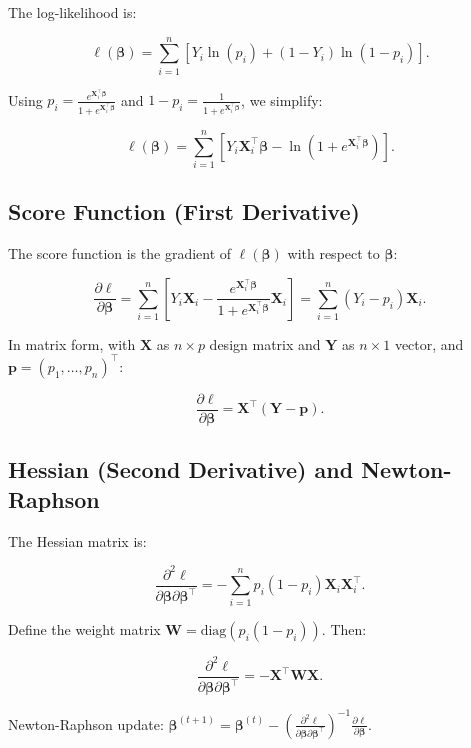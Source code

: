 \documentclass[12pt]{article}
\begin{document}
	The log-likelihood is:
	
	\[
	\ell(\boldsymbol{\beta}) = \sum_{i=1}^n \left[ Y_i \ln(p_i) + (1-Y_i)\ln(1-p_i) \right].
	\]
	
	Using $p_i = \frac{e^{\mathbf{X}_i^\top \boldsymbol{\beta}}}{1+e^{\mathbf{X}_i^\top \boldsymbol{\beta}}}$ and $1-p_i = \frac{1}{1+e^{\mathbf{X}_i^\top \boldsymbol{\beta}}}$, we simplify:
	
	\[
	\ell(\boldsymbol{\beta}) = \sum_{i=1}^n \left[ Y_i \mathbf{X}_i^\top \boldsymbol{\beta} - \ln\left(1 + e^{\mathbf{X}_i^\top \boldsymbol{\beta}}\right) \right].
	\]
	
	\subsection{Score Function (First Derivative)}
	
	The score function is the gradient of $\ell(\boldsymbol{\beta})$ with respect to $\boldsymbol{\beta}$:
	
	\[
	\frac{\partial \ell}{\partial \boldsymbol{\beta}} = \sum_{i=1}^n \left[ Y_i \mathbf{X}_i - \frac{e^{\mathbf{X}_i^\top \boldsymbol{\beta}}}{1+e^{\mathbf{X}_i^\top \boldsymbol{\beta}}} \mathbf{X}_i \right] = \sum_{i=1}^n (Y_i - p_i) \mathbf{X}_i.
	\]
	
	In matrix form, with $\mathbf{X}$ as $n \times p$ design matrix and $\mathbf{Y}$ as $n \times 1$ vector, and $\mathbf{p} = (p_1,\dots,p_n)^\top$:
	
	\[
	\frac{\partial \ell}{\partial \boldsymbol{\beta}} = \mathbf{X}^\top (\mathbf{Y} - \mathbf{p}).
	\]
	
	\subsection{Hessian (Second Derivative) and Newton-Raphson}
	
	The Hessian matrix is:
	
	\[
	\frac{\partial^2 \ell}{\partial \boldsymbol{\beta} \partial \boldsymbol{\beta}^\top} = -\sum_{i=1}^n p_i (1-p_i) \mathbf{X}_i \mathbf{X}_i^\top.
	\]
	
	Define the weight matrix $\mathbf{W} = \text{diag}(p_i(1-p_i))$. Then:
	
	\[
	\frac{\partial^2 \ell}{\partial \boldsymbol{\beta} \partial \boldsymbol{\beta}^\top} = -\mathbf{X}^\top \mathbf{W} \mathbf{X}.
	\]
	
	Newton-Raphson update: $\boldsymbol{\beta}^{(t+1)} = \boldsymbol{\beta}^{(t)} - \left(\frac{\partial^2 \ell}{\partial \boldsymbol{\beta} \partial \boldsymbol{\beta}^\top}\right)^{-1} \frac{\partial \ell}{\partial \boldsymbol{\beta}}$.
	
\end{document}
